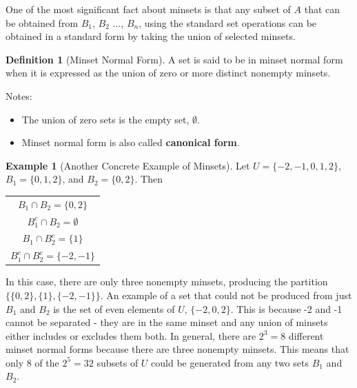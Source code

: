\documentclass[10pt,]{book}
\newcommand{\terminology}[1]{\textbf{#1}}
\theoremstyle{plain}
\theoremstyle{definition}
\newtheorem{definition}[theorem]{Definition}
\theoremstyle{definition}
\newtheorem{example}[theorem]{Example}
\theoremstyle{definition}
\begin{document}
One of the most significant fact about minsets is that any subset of \(A\) that can be obtained
from  \(B_1\), \(B_2\) \(\ldots\), \(B_n\), using the standard set operations can be obtained in a standard form by taking the union of selected minsets.%
\begin{definition}[Minset Normal Form]\label{def-minset-normal-form}
A set is said to be in minset normal form when it is expressed as the union of zero or more distinct nonempty minsets.%
\end{definition}
\par
Notes:%
\par
\leavevmode%
\begin{itemize}[label=\textbullet]
\item{} The union of zero sets is the empty set, \(\emptyset\).%
\item{} Minset normal form is also called \terminology{canonical form}.%
\end{itemize}
%
\begin{example}[Another Concrete Example of Minsets]\label{ex-concrete-minsets-2}
 Let \(U = \{-2,-1,0,1,2\}\), \(B_1= \{0,1,2\}\), and \(B_2= \{0,2\}\).  Then%
\leavevmode%
\begin{table}
\centering
\begin{tabular}{c}
\(B_1\cap B_2=\{0,2\}\) \tabularnewline[0pt]
\(B_1^c\cap B_2 = \emptyset\) \tabularnewline[0pt]
\(B_1\cap B_2^c = \{1\}\) \tabularnewline[0pt]
\(B_1^c\cap B_2^c = \{-2,-1\}\) 
\end{tabular}
\end{table}
\par
In this case, there are only three nonempty minsets, producing the partition \(\{\{0,2\},\{1\},\{-2,-1\}\}\). An example of a set that could not be produced from just \(B_1\) and \(B_2\) is the set of even elements of \(U\), \(\{-2,0,2\}\). This is because -2 and -1 cannot be separated - they are in the same minset and any union of minsets either includes or excludes them both.  In general, there are \(2^3= 8\) different minset normal forms because there are three nonempty minsets. This means that only 8 of the \(2^5=32\) subsets of \(U\) could be generated from  any two sets \(B_1\) and \(B_2\). %
\end{example}
\typeout{************************************************}
\typeout{************************************************}
\end{document}
